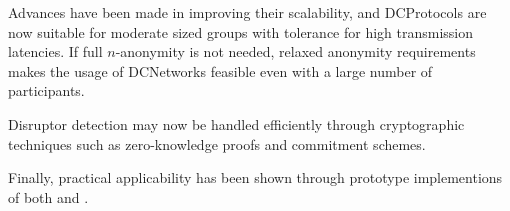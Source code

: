 Advances have been made in improving their scalability, and \acp{DCProtocol} 
are now suitable for moderate sized groups with tolerance for high
transmission latencies. If full $n$-anonymity is not needed, relaxed
anonymity requirements makes the usage of \acp{DCNetwork} feasible even with
a large number of participants.

Disruptor detection may now be handled efficiently through cryptographic techniques
such as zero-knowledge proofs and commitment schemes.

Finally, practical applicability has been shown through prototype implementions
of both \Verdict and \Dissent.

\begin{comment}
Important points:

* Non-interactive
* Computationally/Unconditionally secure
* No central trusted party
* Shuffled send
* Security goals: integrity, anonymity, accountability (See dissent 2.3)
* Attack model (dissent 2.3)
* Assumptions, highlight difference between them (Faulty nodes never silent, ..., dissent 2.4)

Sections:

* 88: Base protocol
* 89: Disco (unconditional untraceability, computationally secure serviceability)
* 89: Waidner (Unreliable channel)
* 90: Detection of disruptors
* (03: Herbivore)
* 03: k-anonymity (maybe this is related work instead? weakens security goals to gain efficiency). Small DC subnets.
* 04: dc-revisited (proactive accountability. efficient cheater detection + recovery)
* 10: Dissent
* 13: Verdict

Definitions:

* Anonymity set
* Anonymity terms (cite def paper)
* Anonymity game (dissent [7])
* k-anonymity (k-anonymity)
* Robustness? (k-anonymity 3.3)
* (Partial, Full) Collusion
* Disruption
* Anytrust assumption
* Zero knowledge proofs

Attacks:

* Sybil (dissent [17])
* Sock puppetry (dissent [36])
* Traffic analysis (verdict [4, 34, 38])

Related work:

* Mix nets
* Crowds (dissent [29])
* CliqueNet (k-anon [17])
* Verifiable shuffles
* Group signatures, ring signatures
* Herbivore

Random notes:

* k-anonymous provide anonymity only when most members are honest (see dissent, related work)
* Herbivore provides anonymity only within small subgroups

\end{comment}
